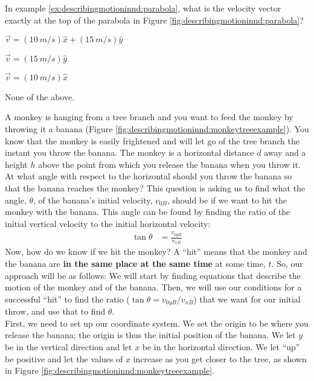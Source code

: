 \begin{checkpoint}{\begin{MCquestion}{In example \ref{ex:describingmotioninnd:parabola}, what is the velocity vector exactly at the top of the parabola in Figure \ref{fig:describingmotioninnd:parabola}?}
\item $\vec v=(\SI{10}{m/s})\hat x+(\SI{15}{m/s})\hat y$
\item $\vec v=(\SI{15}{m/s})\hat y$
\item $\vec v=(\SI{10}{m/s})\hat x$ %
\item None of the above.
\end{MCquestion}}
\end{checkpoint}
\begin{example}{
A monkey is hanging from a tree branch and you want to feed the monkey by throwing it a banana (Figure \ref{fig:describingmotioninnd:monkeytreeexample}). You know that the monkey is easily frightened and will let go of the tree branch the instant you throw the banana. The monkey is a horizontal distance $d$ away and a height $h$ above the point from which you release the banana when you throw it. At what angle with respect to the horizontal should you throw the banana so that the banana reaches the monkey?}
This question is asking us to find what the angle, $\theta$, of the banana's initial velocity, $v_{0B}$, should be if we want to hit the monkey with the banana. This angle can be found by finding the ratio of the initial vertical velocity to the initial horizontal velocity:
\begin{align*}
\tan\theta&=\frac{v_{0yB}}{v_{xB}}
\end{align*}
Now, how do we know if we hit the monkey? A ``hit'' means that the monkey and the banana are \textbf{in the same place at the same time} at some time, $t$. So, our approach will be as follows: We will start by finding equations that describe the motion of the monkey and of the banana. Then, we will use our conditions for a successful ``hit'' to find the ratio ($\tan\theta=v_{0yB}/v_{xB}$) that we want for our initial throw, and use that to find $\theta$.\\

First, we need to set up our coordinate system. We set the origin to be where you release the banana; the origin is thus the initial position of the banana. We let $y$ be in the vertical direction and let $x$ be in the horizontal direction. We let ``up'' be positive and let the values of $x$ increase as you get closer to the tree, as shown in Figure \ref{fig:describingmotioninnd:monkeytreeexample}. 


\end{example}
